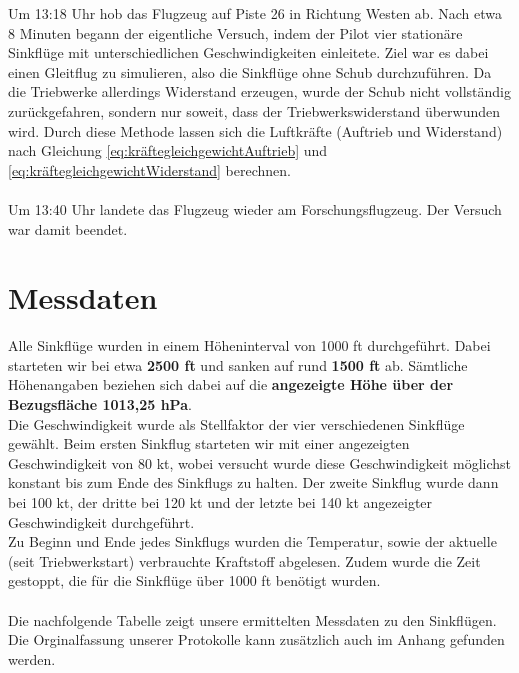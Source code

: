 \vspace{-0.3cm}
\begin{center}
\end{center}
\vspace{0.8cm}

\noindent Um 13:18 Uhr hob das Flugzeug auf Piste 26 in Richtung Westen ab. Nach etwa 8 Minuten begann der eigentliche Versuch, indem der Pilot vier stationäre Sinkflüge mit unterschiedlichen Geschwindigkeiten einleitete. Ziel war es dabei einen Gleitflug zu simulieren, also die Sinkflüge ohne Schub durchzuführen. Da die Triebwerke allerdings Widerstand erzeugen, wurde der Schub nicht vollständig zurückgefahren, sondern nur soweit, dass der Triebwerkswiderstand überwunden wird. Durch diese Methode lassen sich die Luftkräfte (Auftrieb und Widerstand) nach Gleichung \ref{eq:kräftegleichgewichtAuftrieb} und \ref{eq:kräftegleichgewichtWiderstand} berechnen.\\\\  
Um 13:40 Uhr landete das Flugzeug wieder am Forschungsflugzeug. Der Versuch war damit beendet.

\section{Messdaten}
Alle Sinkflüge wurden in einem Höheninterval von 1000 ft durchgeführt. Dabei starteten wir bei etwa \textbf{2500 ft} und sanken auf rund \textbf{1500 ft} ab. Sämtliche Höhenangaben beziehen sich dabei auf die \textbf{angezeigte Höhe über der Bezugsfläche 1013,25 hPa}.\\
Die Geschwindigkeit wurde als Stellfaktor der vier verschiedenen Sinkflüge gewählt. Beim ersten Sinkflug starteten wir mit einer angezeigten Geschwindigkeit von 80 kt, wobei versucht wurde diese Geschwindigkeit möglichst konstant bis zum Ende des Sinkflugs zu halten. Der zweite Sinkflug wurde dann bei 100 kt, der dritte bei 120 kt und der letzte bei 140 kt angezeigter Geschwindigkeit durchgeführt.\\
Zu Beginn und Ende jedes Sinkflugs wurden die Temperatur, sowie der aktuelle (seit Triebwerkstart) verbrauchte Kraftstoff abgelesen. Zudem wurde die Zeit gestoppt, die für die Sinkflüge über 1000 ft benötigt wurden.\\\\
Die nachfolgende Tabelle zeigt unsere ermittelten Messdaten zu den Sinkflügen. Die Orginalfassung unserer Protokolle kann zusätzlich auch im Anhang gefunden werden.\\

